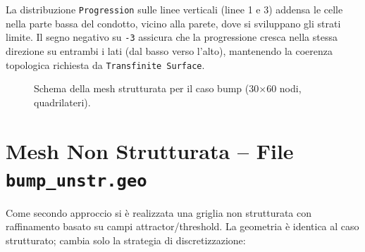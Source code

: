 La distribuzione \texttt{Progression} sulle linee verticali (linee 1 e 3) addensa le celle
nella parte bassa del condotto, vicino alla parete, dove si sviluppano gli strati limite.
Il segno negativo su \texttt{-3} assicura che la progressione cresca nella stessa direzione
su entrambi i lati (dal basso verso l'alto), mantenendo la coerenza topologica richiesta
da \texttt{Transfinite Surface}.

\begin{figure}[H]
  \centering
  \caption{Schema della mesh strutturata per il caso bump (30$\times$60 nodi, quadrilateri).}
  \label{fig:mesh_strutturata_bump}
\end{figure}

\section{Mesh Non Strutturata -- File \texttt{bump\_unstr.geo}}
\label{sec:bump_unstr}

Come secondo approccio si è realizzata una griglia non strutturata con raffinamento
basato su campi attractor/threshold. La geometria è identica al caso strutturato; cambia
solo la strategia di discretizzazione:


